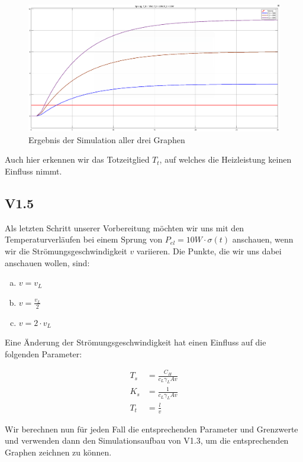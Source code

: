 \documentclass{report}
\begin{document}
\begin{figure}[h]
  \centering
  \includegraphics[width=\textwidth]{../assets/images/RTP/rtp_1_V14_2.png}
  \caption{Ergebnis der Simulation aller drei Graphen}
  \label{fig:rtp1v14_2}
\end{figure}

Auch hier erkennen wir das Totzeitglied $T_{t}$, auf welches die Heizleistung keinen Einfluss nimmt.

\newpage

\subsection{V1.5}

Als letzten Schritt unserer Vorbereitung möchten wir uns mit den Temperaturverläufen bei einem Sprung von $P_{el} = 10W\cdot \sigma(t)$ anschauen, wenn wir die Strömungsgeschwindigkeit $v$ variieren. Die Punkte, die wir uns dabei anschauen wollen, sind:

\begin{enumerate}[a)]
   \item $v = v_{L}$
   \item $v = \frac{v_{L}}{2}$
   \item $v = 2 \cdot v_{L}$
\end{enumerate}

Eine Änderung der Strömungsgeschwindigkeit hat einen Einfluss auf die folgenden Parameter:

\begin{align*}
  \label{eq:10}
  T_{s} &= \frac{C_{H}}{c_{L}\gamma_{L}Av}\\
  K_{s} &= \frac{1}{c_{L}\gamma_{L}Av}\\
  T_{t} &= \frac{l}{v}
\end{align*}

Wir berechnen nun für jeden Fall die entsprechenden Parameter und Grenzwerte und verwenden dann den Simulationsaufbau von V1.3, um die entsprechenden Graphen zeichnen zu können.
\end{document}

